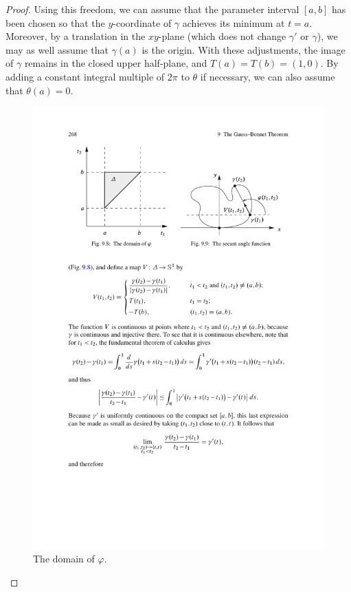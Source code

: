 \begin{proof}
Using this freedom, we can assume that the parameter interval $[a,b]$ has been chosen so that the $y$-coordinate of $\gamma$ achieves its minimum at $t=a$. Moreover, by 
a translation in the $xy$-plane (which does not change $\gamma'$ or $\gamma$), we may as well assume that $\gamma(a)$ is the origin. With these adjustments, the image 
of $\gamma$ remains in the closed upper half-plane, and $T(a)=T(b)=(1,0)$. By adding a constant integral multiple of $2\pi$ to $\theta$ if necessary, we can also assume 
that $\theta(a)=0$.
\begin{figure}[htbp]
\centering
\begin{minipage}[b]{200pt}
\centering
\includegraphics{pictures/rotation-index-domain.pdf}
\caption{The domain of $\varphi$.}
\end{minipage}

\end{figure}
\end{proof}
